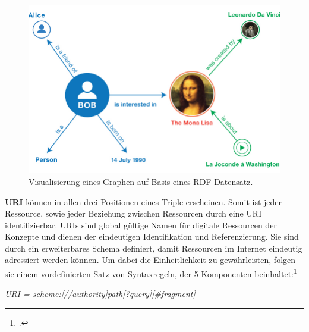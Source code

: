 \documentclass[12pt,a4paper]{article}
\begin{document}
\begin{figure}[H]
  \centering
	\includegraphics[width=1\textwidth]{img/rdf_example.png}  
    \caption[Visualisierung eines Graphen auf Basis eines RDF-Datensatz, w3.org/TR/rdf11-primer, 10.04.2019.]{Visualisierung eines Graphen auf Basis eines RDF-Datensatz.}
  	\label{fig:rdf_example}
\end{figure}
\textbf{URI} können in allen drei Positionen eines Triple erscheinen. Somit ist jeder Ressource, sowie jeder Beziehung zwischen Ressourcen durch eine URI identifizierbar. URIs sind global gültige Namen für digitale Ressourcen der Konzepte und dienen der eindeutigen Identifikation und Referenzierung. Sie sind durch ein erweiterbares Schema definiert, damit Ressourcen im Internet eindeutig adressiert werden können. Um dabei die Einheitlichkeit zu gewährleisten, folgen sie einem vordefinierten Satz von Syntaxregeln, der 5 Komponenten beinhaltet:\footcite[][]{berners2004uniform}
\begin{center}
\textit{URI = scheme:[//authority]path[?query][\#fragment]}
\\
\end{center}
\end{document}
